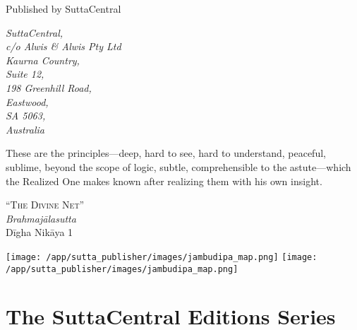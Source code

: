\documentclass[12pt,openany]{book}%
\newcommand{\blankpage}{
\newpage
\thispagestyle{empty}
\mbox{}
\newpage
}
\newcommand*{\epigraphTranslatedTitle}[1]{\vspace*{.5em}\footnotesize\textsc{#1}\\}%
\newcommand*{\epigraphRootTitle}[1]{\footnotesize\textit{#1}\\}%
\newcommand*{\epigraphReference}[1]{\footnotesize{#1}}%
\begin{document}
\begin{footnotesize}
\medskip

Published by SuttaCentral

\medskip

\textit{SuttaCentral,\\
c/o Alwis \& Alwis Pty Ltd\\
Kaurna Country,\\
Suite 12,\\
198 Greenhill Road,\\
Eastwood,\\
SA 5063,\\
Australia}

\end{footnotesize}

\newpage

\setlength{\parindent}{1em}%
\newpage

\vspace*{\fill}

\begin{center}
\epigraph{These are the principles—deep, hard to see, hard to understand, peaceful, sublime, beyond the scope of logic, subtle, comprehensible to the astute—which the Realized One makes known after realizing them with his own insight.}
{
\epigraphTranslatedTitle{“The Divine Net”}
\epigraphRootTitle{\textsanskrit{Brahmajālasutta}}
\epigraphReference{\textsanskrit{Dīgha} \textsanskrit{Nikāya} 1}
}
\end{center}

\vspace*{2in}

\vspace*{\fill}

\setlength{\parindent}{0em}
\sbox{}%
\texttt{[image: /app/sutta\_publisher/images/jambudipa\_map.png]}
\newpage
\texttt{[image: /app/sutta\_publisher/images/jambudipa\_map.png]}
\newpage
\restoregeometry

\blankpage%

\setlength{\parindent}{1em}
%
\tableofcontents
\newpage
\pagestyle{fancy}
%
\chapter*{The SuttaCentral Editions Series}
\end{document}
